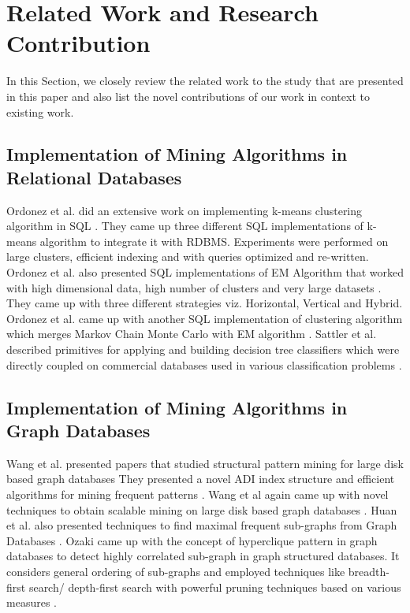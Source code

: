 \documentclass[11pt]{article}
\begin{document}
\section{Related Work and Research Contribution}
In this Section, we closely review the related work to the study that are presented in this paper and also list the novel contributions of our work in context to existing work.
\normalfont \subsection {\normalfont \textbf{Implementation of Mining Algorithms in Relational Databases}}
\par{Ordonez et al. did an extensive work on implementing k-means clustering algorithm in SQL \cite{ordonez2004}. They came up three different SQL implementations of k-means algorithm to integrate it with RDBMS. Experiments were performed on large clusters, efficient indexing and with queries optimized and re-written.  Ordonez et al. also presented SQL implementations of EM Algorithm that worked with high dimensional data, high number of clusters and very large datasets \cite{ordonezc}. They came up with three different strategies viz. Horizontal, Vertical and Hybrid.  Ordonez et al. came up with another SQL implementation of clustering algorithm which merges Markov Chain Monte Carlo with EM algorithm \cite{ordonezmcmc}.  Sattler et al. described primitives for applying and building decision tree classifiers which were directly coupled on commercial databases used in various classification problems \cite{ron1996power}.}
\normalfont \subsection {\normalfont \textbf{Implementation of Mining Algorithms in Graph Databases}}
\par{Wang et al. presented papers that studied structural pattern mining for large disk based graph databases They presented a novel ADI index structure and efficient algorithms for mining frequent patterns \cite{wang1}. Wang et al again came up with novel techniques to obtain scalable mining on large disk based graph databases \cite{wang2}. Huan et al. also presented techniques to find maximal frequent sub-graphs from Graph Databases \cite{huan}. Ozaki came up with the concept of hyperclique pattern in graph databases to detect highly correlated sub-graph in graph structured databases. It considers general ordering of sub-graphs and employed techniques like breadth-first search/ depth-first search with powerful pruning techniques based on various measures \cite{ozaki}.}
\end{document}
